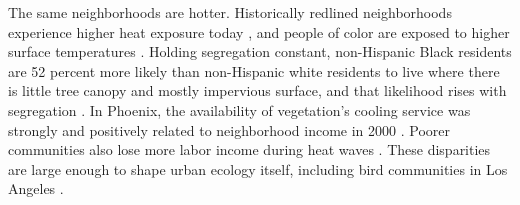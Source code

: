 \documentclass[12pt]{article}
\begin{document}
The same neighborhoods are hotter. Historically redlined neighborhoods experience higher heat exposure today \citep{hoffmanEffectsHistoricalHousing2020, wilsonUrbanHeatManagement2020, conzelmannLongTermEffectsRedlining2022}, and people of color are exposed to higher surface temperatures \citep{hsuDisproportionateExposureUrban2021, renteriaEtAlSocialDisparities2022}. Holding segregation constant, non-Hispanic Black residents are 52 percent more likely than non-Hispanic white residents to live where there is little tree canopy and mostly impervious surface, and that likelihood rises with segregation \citep{jesdale_racialethnic_2013}. In Phoenix, the availability of vegetation's cooling service was strongly and positively related to neighborhood income in 2000 \citep{jenerette_ecosystem_2011}. Poorer communities also lose more labor income during heat waves \citep{behrerHeatLargerImpacts2021}. These disparities are large enough to shape urban ecology itself, including bird communities in Los Angeles \citep{schellEcologicalEvolutionaryConsequences2020, woodHistoricalRacialRedlining2023}.
\end{document}
